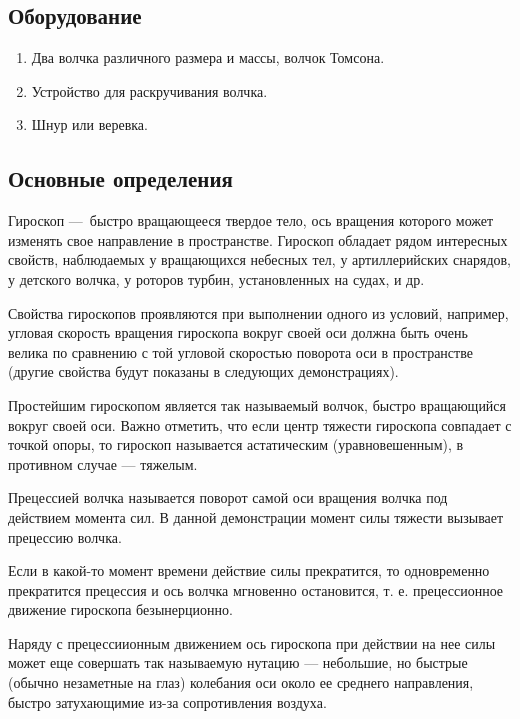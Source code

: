 	\subsection*{\textcolor{PineGreen}{Оборудование}}

			\begin{enumerate} 
			\item Два волчка различного размера и массы, волчок Томсона.
			\item Устройство для раскручивания волчка.
			\item Шнур или веревка.
		\end{enumerate}

		\subsection*{\textcolor{PineGreen}{Основные определения}}
	
	Гироскоп — быстро вращающееся твердое тело, ось вращения которого может изменять 
	свое направление в пространстве.
	Гироскоп обладает рядом интересных свойств, наблюдаемых у вращающихся небесных тел, у артиллерийских снарядов, у детского волчка, у роторов турбин, установленных на судах, и др.
	
Свойства гироскопов проявляются при выполнении одного из условий, например, угловая скорость вращения гироскопа вокруг своей оси должна быть очень велика по сравнению с той угловой скоростью поворота оси в пространстве (другие свойства будут показаны в следующих демонстрациях).
	
Простейшим гироскопом является так называемый волчок, быстро вращающийся вокруг своей оси.  
Важно отметить, что если центр тяжести гироскопа совпадает с точкой опоры, то гироскоп называется астатическим (уравновешенным), 
в противном случае — тяжелым.

Прецессией волчка называется поворот самой оси вращения волчка под действием момента сил. В данной демонстрации момент силы тяжести вызывает прецессию волчка.

Если в какой-то момент времени действие силы прекратится, то одновременно прекратится прецессия и ось 
волчка мгновенно остановится, т. е. прецессионное движение гироскопа безынерционно.

Наряду с прецессиионным движением ось гироскопа при действии на нее силы может еще совершать так называемую нутацию — небольшие, 
но быстрые (обычно незаметные на глаз) колебания оси около ее среднего направления, быстро затухающимие из-за сопротивления воздуха.

